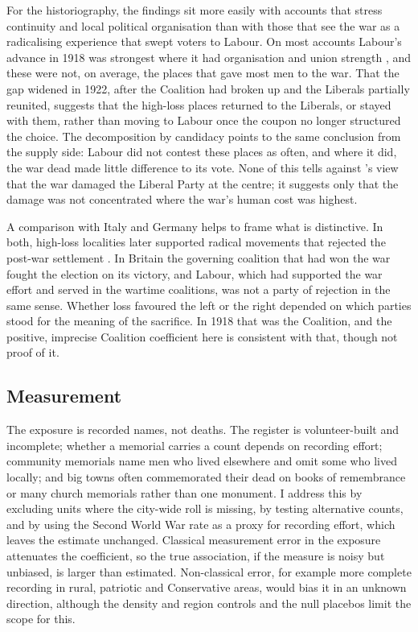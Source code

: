 \documentclass[11pt,a4paper]{article}
\begin{document}
For the historiography, the findings sit more easily with accounts that stress continuity and local political organisation than with those that see the war as a radicalising experience that swept voters to Labour. On most accounts Labour's advance in 1918 was strongest where it had organisation and union strength \citep{mckibbin1974,tanner1990}, and these were not, on average, the places that gave most men to the war. That the gap widened in 1922, after the Coalition had broken up and the Liberals partially reunited, suggests that the high-loss places returned to the Liberals, or stayed with them, rather than moving to Labour once the coupon no longer structured the choice. The decomposition by candidacy points to the same conclusion from the supply side: Labour did not contest these places as often, and where it did, the war dead made little difference to its vote. None of this tells against \citet{wilson1966}'s view that the war damaged the Liberal Party at the centre; it suggests only that the damage was not concentrated where the war's human cost was highest.

A comparison with Italy and Germany helps to frame what is distinctive. In both, high-loss localities later supported radical movements that rejected the post-war settlement \citep{acemoglu2022,dejuan2024}. In Britain the governing coalition that had won the war fought the election on its victory, and Labour, which had supported the war effort and served in the wartime coalitions, was not a party of rejection in the same sense. Whether loss favoured the left or the right depended on which parties stood for the meaning of the sacrifice. In 1918 that was the Coalition, and the positive, imprecise Coalition coefficient here is consistent with that, though not proof of it.

\subsection{Measurement}
The exposure is recorded names, not deaths. The register is volunteer-built and incomplete; whether a memorial carries a count depends on recording effort; community memorials name men who lived elsewhere and omit some who lived locally; and big towns often commemorated their dead on books of remembrance or many church memorials rather than one monument. I address this by excluding units where the city-wide roll is missing, by testing alternative counts, and by using the Second World War rate as a proxy for recording effort, which leaves the estimate unchanged. Classical measurement error in the exposure attenuates the coefficient, so the true association, if the measure is noisy but unbiased, is larger than estimated. Non-classical error, for example more complete recording in rural, patriotic and Conservative areas, would bias it in an unknown direction, although the density and region controls and the null placebos limit the scope for this.
\end{document}
